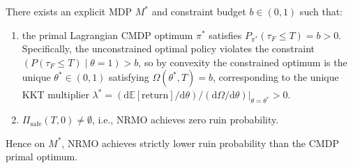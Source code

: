 \begin{theorem}
\label{thm:arxiv-cmdp-separation}
There exists an explicit MDP $M^*$ and constraint budget
$b \in (0, 1)$ such that:

\begin{enumerate}
\item[(i)] the primal Lagrangian CMDP optimum $\pi^*$ satisfies
$P_{\pi^*}(\tau_F \le T) = b > 0$. Specifically, the unconstrained
optimal policy violates the constraint
$(P(\tau_F \le T) \mid \theta = 1) > b$, so by convexity the
constrained optimum is the unique $\theta^* \in (0, 1)$ satisfying
$\Omega(\theta^*, T) = b$, corresponding to the unique KKT
multiplier
$\lambda^* = (\mathrm{d}\mathbb{E}[\mathrm{return}] /
\mathrm{d}\theta) / (\mathrm{d}\Omega / \mathrm{d}\theta)
\rvert_{\theta = \theta^*} > 0$.

\item[(ii)] $\Pi_{\mathrm{safe}}(T, 0) \ne \emptyset$, i.e., NRMO
achieves zero ruin probability.
\end{enumerate}

Hence on $M^*$, NRMO achieves strictly lower ruin probability than
the CMDP primal optimum.
\end{theorem}

